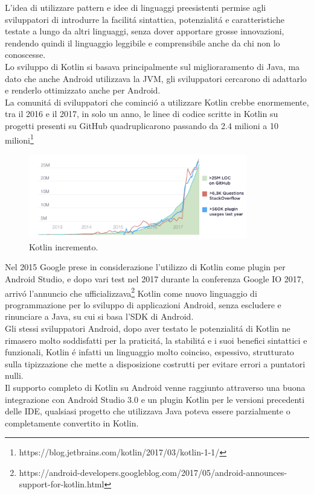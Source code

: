 L'idea di utilizzare pattern e idee di linguaggi preesistenti permise agli sviluppatori di introdurre la facilit\'a sintattica, potenzialit\'a e caratteristiche testate a lungo da altri linguaggi, senza dover apportare grosse innovazioni, rendendo quindi il linguaggio leggibile e comprensibile anche da chi non lo conoscesse.\\
Lo sviluppo di Kotlin si basava principalmente sul miglioraramento di Java, ma dato che anche Android utilizzava la JVM, gli sviluppatori cercarono di adattarlo e renderlo ottimizzato anche per Android.\\
La comunit\'a di sviluppatori che cominci\'o a utilizzare Kotlin crebbe enormemente, tra il 2016 e il 2017, in solo un anno, le linee di codice scritte in Kotlin su progetti presenti su GitHub quadruplicarono passando da 2.4 milioni a 10 milioni\footnote{https://blog.jetbrains.com/kotlin/2017/03/kotlin-1-1/} \\

\begin{figure}[!hb]
  \centering
  \includegraphics[width=0.85\textwidth]{immagini/kotlin_grafico_incremento.png}
  \caption{Kotlin incremento.}\label{fig:Kotlin incremento}
\end{figure}

Nel 2015 Google prese in considerazione l'utilizzo di Kotlin come plugin per Android Studio, e dopo vari test nel 2017 durante la conferenza Google IO 2017, arriv\'o l'annuncio che ufficializzava\footnote{https://android-developers.googleblog.com/2017/05/android-announces-support-for-kotlin.html} Kotlin come nuovo linguaggio di programmazione per lo sviluppo di applicazioni Android, senza escludere e rinunciare a Java, su cui si basa l'SDK di Android.\\
Gli stessi sviluppatori Android, dopo aver testato le potenzialit\'a di Kotlin ne rimasero molto soddisfatti per la praticit\'a, la stabilit\'a e i suoi benefici sintattici e funzionali, Kotlin \'e infatti un linguaggio molto coinciso, espessivo, strutturato sulla tipizzazione che mette a disposizione costrutti per evitare errori a puntatori nulli.\\
Il supporto completo di Kotlin su Android venne raggiunto attraverso una buona integrazione con Android Studio 3.0 e un plugin Kotlin per le versioni precedenti delle IDE, qualsiasi progetto che utilizzava Java poteva essere parzialmente o completamente convertito in Kotlin.





